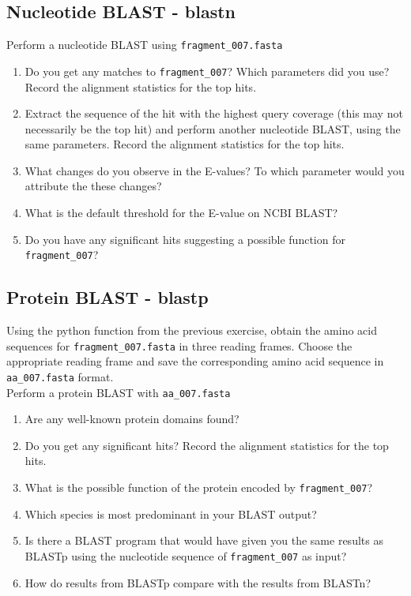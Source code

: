\documentclass[a4paper,11pt]{article}
\begin{document}
\subsection{Nucleotide BLAST - blastn}
Perform a nucleotide BLAST using \texttt{fragment\_007.fasta} 
\begin{enumerate}
\item Do you get any matches to \texttt{fragment\_007}? Which parameters did you use? Record the alignment statistics for the top hits.

\item Extract the sequence of the hit with the highest query coverage (this may not necessarily be the top hit) and perform another nucleotide BLAST, using the same parameters. Record the alignment statistics for the top hits.

\item What changes do you observe in the E-values? To which parameter would you attribute the these changes?  

\item What is the default threshold for the E-value on NCBI BLAST?

\item Do you have any significant hits suggesting a possible function for \texttt{fragment\_007}? 
\end{enumerate}

\subsection{Protein BLAST - blastp}

Using the python function from the previous exercise, obtain the amino acid sequences for \texttt{fragment\_007.fasta} in three reading frames. Choose the appropriate reading frame and save the corresponding amino acid sequence in \texttt{aa\_007.fasta} format.\\

Perform a protein BLAST with \texttt{aa\_007.fasta} 

\begin{enumerate}
\item Are any well-known protein domains found? 

\item Do you get any significant hits? Record the alignment statistics for the top hits. 

\item What is the possible function of the protein encoded by \texttt{fragment\_007}?

\item Which species is most predominant in your BLAST output?

\item Is there a BLAST program that would have given you the same results as BLASTp using the nucleotide sequence of \texttt{fragment\_007} as input?

\item How do results from BLASTp compare with the results from BLASTn?

\end{enumerate}
\end{document}
